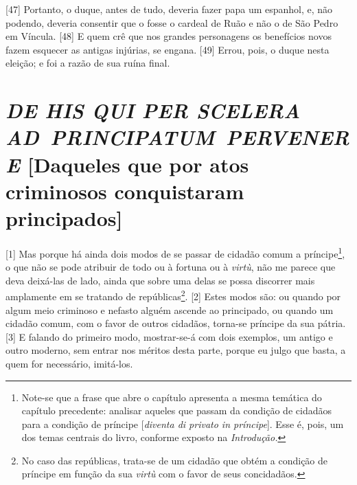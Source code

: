 \quebra

{[}47{]}
Portanto, o duque, antes de tudo, deveria fazer papa um espanhol, e, não
podendo, deveria consentir que o fosse o cardeal de Ruão e não o de São
Pedro em Víncula. {[}48{]} E quem crê que nos grandes personagens os 
benefícios novos fazem esquecer as antigas injúrias, se engana. {[}49{]}
Errou, pois, o duque nesta eleição; e foi a razão de sua ruína final.

\quebra\section{\emph{DE HIS QUI PER SCELERA AD~PRINCIPATUM~PERVENERE}\break
{[}Daqueles que por atos criminosos conquistaram principados{]}}

{[}1{]} Mas porque há ainda dois modos de se passar de cidadão comum a
príncipe\footnote{Note-se que a frase que abre o capítulo apresenta a
  mesma temática do capítulo precedente: analisar aqueles que passam da
  condição de cidadãos para a condição de príncipe {[}\emph{diventa di
  privato in príncipe}{]}. Esse é, pois, um dos temas centrais do livro,
  conforme exposto na \emph{Introdução.}}, o que não se pode atribuir de
todo ou à fortuna ou à \emph{virtù}, não me parece que deva deixá-las de
lado, ainda que sobre uma delas se possa discorrer mais amplamente em se
tratando de repúblicas\footnote{No caso das repúblicas, trata-se de um
  cidadão que obtém a condição de príncipe em função da sua \emph{virtù}
  com o favor de seus concidadãos.}. {[}2{]} Estes modos são: ou quando
por algum meio criminoso e nefasto alguém ascende ao principado, ou
quando um cidadão comum, com o favor de outros cidadãos, torna-se
príncipe da sua pátria. {[}3{]} E falando do primeiro modo, mostrar-se-á
com dois exemplos, um antigo e outro moderno, sem entrar nos méritos
desta parte, porque eu julgo que basta, a quem for necessário,
imitá-los.

